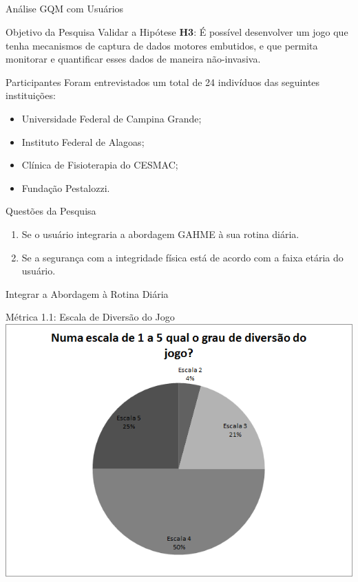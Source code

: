 \documentclass{beamer}
\begin{document}
\subsection{}
\begin{frame}{Análise GQM com Usuários} 
    \begin{block}{Objetivo da Pesquisa}
      Validar a Hipótese \textbf{H3}: É possível desenvolver um jogo que tenha mecanismos de captura de dados motores embutidos, e que permita monitorar e quantificar esses dados de maneira não-invasiva.
    \end{block}
		\begin{block}{Participantes}
		Foram entrevistados um total de 24 indivíduos das seguintes instituições:
			\begin{itemize}
				\item Universidade Federal de Campina Grande;
				\item Instituto Federal de Alagoas;
				\item Clínica de Fisioterapia do CESMAC;
				\item Fundação Pestalozzi.
			\end{itemize}
    \end{block}
\end{frame} 

\begin{frame}{Questões da Pesquisa} 
    \begin{block}{}
			\begin{enumerate}
				\item Se o usuário integraria a abordagem GAHME à sua rotina diária.
				\item Se a segurança com a integridade física está de acordo com a faixa etária do usuário.
			\end{enumerate}
    \end{block}
\end{frame}

\begin{frame}{Integrar a Abordagem à Rotina Diária} 
    \begin{block}{Métrica 1.1: Escala de Diversão do Jogo}
			\center \includegraphics[height=2.6 in]{img/chart_1-.png}
    \end{block}
\end{frame}
\end{document}
